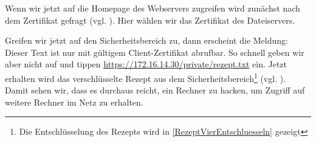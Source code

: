 
Wenn wir jetzt auf die Homepage des Webservers zugreifen wird zunächst nach dem
Zertifikat gefragt (vgl. ). Hier wählen wir das
Zertifikat des Dateiservers.


Greifen wir jetzt auf den Sicherheitsbereich zu, dann erscheint die Meldung:
\glqq{}Dieser Text ist nur mit gültigem Client-Zertifikat abrufbar\grqq{}. So
schnell geben wir aber nicht auf und tippen
\url{https://172.16.14.30/private/rezept.txt} ein. Jetzt erhalten wird das
verschlüsselte Rezept aus dem Sicherheitsbereich\footnote{Die Entschlüsselung
  des Rezepts wird in \cref{RezeptVierEntschluesseln} gezeigt}
(vgl. ). Damit sehen wir, dass es durchaus reicht,
ein Rechner zu hacken, um Zugriff auf weitere Rechner im Netz zu erhalten.




